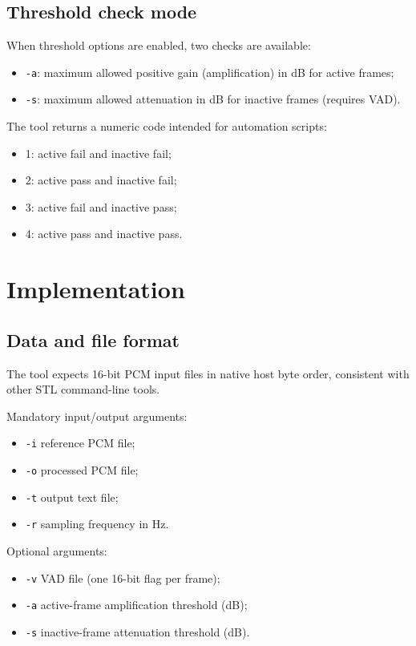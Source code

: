 \subsection{Threshold check mode}

When threshold options are enabled, two checks are available:
\begin{itemize}
\item \texttt{-a}: maximum allowed positive gain (amplification) in dB for active frames;
\item \texttt{-s}: maximum allowed attenuation in dB for inactive frames (requires VAD).
\end{itemize}

The tool returns a numeric code intended for automation scripts:
\begin{itemize}
\item 1: active fail and inactive fail;
\item 2: active pass and inactive fail;
\item 3: active fail and inactive pass;
\item 4: active pass and inactive pass.
\end{itemize}

\section{Implementation}
\label{sec:gain_chk-impl}

\subsection{Data and file format}

The tool expects 16-bit PCM input files in native host byte order,
consistent with other STL command-line tools.

Mandatory input/output arguments:
\begin{itemize}
\item \texttt{-i} reference PCM file;
\item \texttt{-o} processed PCM file;
\item \texttt{-t} output text file;
\item \texttt{-r} sampling frequency in Hz.
\end{itemize}

Optional arguments:
\begin{itemize}
\item \texttt{-v} VAD file (one 16-bit flag per frame);
\item \texttt{-a} active-frame amplification threshold (dB);
\item \texttt{-s} inactive-frame attenuation threshold (dB).
\end{itemize}

